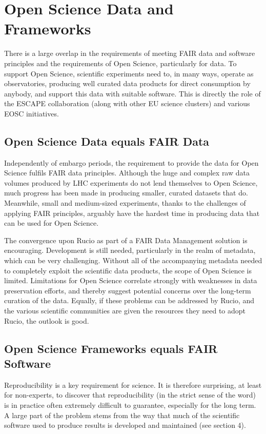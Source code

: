 \section{Open Science Data and Frameworks}

There is a large overlap in the requirements of meeting FAIR data and software principles
and the requirements of Open Science, particularly for data. To support Open Science, scientific experiments need to, in many ways, operate as observatories, producing well curated data products for direct consumption by anybody, and support this data with suitable software. This is directly the role of the ESCAPE collaboration (along with other EU science clusters) and various EOSC initiatives.


\subsection{Open Science Data equals FAIR Data}

Independently of embargo periods, the requirement to provide the data for Open Science fulfils FAIR data principles.  Although the huge and complex raw data volumes produced by LHC experiments do not lend themselves to Open Science, much progress has been made in producing smaller, curated datasets that do.  Meanwhile, small and medium-sized experiments, thanks to the challenges of applying FAIR principles, arguably have the hardest time in producing data that can be used for Open Science.

The convergence upon Rucio as part of a FAIR Data Management solution is encouraging.  Development is still needed, particularly in the realm of metadata, which can be very challenging.  Without all of the accompanying metadata needed to completely exploit the scientific data products, the scope of Open Science is limited.  Limitations for Open Science correlate strongly with weaknesses in data preservation efforts, and thereby suggest potential concerns over the long-term curation of the data.  Equally, if these problems can be addressed by Rucio, and the various scientific communities are given the resources they need to adopt Rucio, the outlook is good.

\subsection{Open Science Frameworks equals FAIR Software}

Reproducibility is a key requirement for science.  It is therefore surprising, at least for non-experts, to discover that reproducibility (in the strict sense of the word) is in practice often extremely difficult to guarantee, especially for the long term. A large part of the problem stems from the way that much of the scientific software used to produce results is developed and maintained (see section 4).

